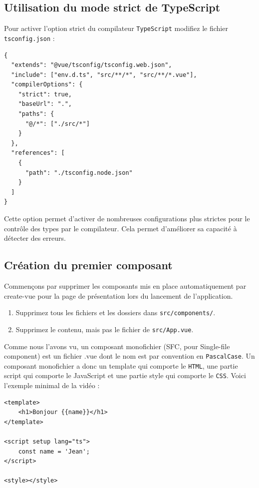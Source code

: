 \documentclass{article}
\begin{document}
\subsection{Utilisation du mode {\color{monOrange}strict} de {\color{monOrange}TypeScript}}
Pour activer l'option {\color{monOrange}strict} du compilateur {\tt TypeScript} modifiez le fichier {\tt tsconfig.json} :
\begin{verbatim}
{
  "extends": "@vue/tsconfig/tsconfig.web.json",
  "include": ["env.d.ts", "src/**/*", "src/**/*.vue"],
  "compilerOptions": {
    "strict": true,
    "baseUrl": ".",
    "paths": {
      "@/*": ["./src/*"]
    }
  },
  "references": [
    {
      "path": "./tsconfig.node.json"
    }
  ]
}
\end{verbatim} 

Cette option permet d'activer de nombreuses configurations plus strictes pour le contrôle des types par le compilateur. Cela permet d'améliorer sa capacité à détecter des erreurs.

\subsection{Création du premier composant}
Commençons par supprimer les composants mis en place automatiquement par {\color{monOrange}create-vue} pour la page de présentation lors du lancement de l'application. 
\begin{enumerate}
\item Supprimez tous les fichiers et les dossiers dans {\tt src/components/}.
\item Supprimez le contenu, mais pas le fichier de {\tt src/App.vue}.
\end{enumerate}

Comme nous l'avons vu, un composant {\color{blue} monofichier} (SFC, pour Single-file component) est un fichier {\color{blue} .vue} dont le nom est par convention en {\tt PascalCase}. Un composant monofichier a donc un template qui comporte le {\tt HTML}, une partie script qui comporte le JavaScript et une partie style qui comporte le {\tt CSS}. Voici l'exemple minimal de la vidéo :
\begin{verbatim}
<template>
    <h1>Bonjour {{name}}</h1>
</template>

<script setup lang="ts">
    const name = 'Jean';
</script>

<style></style>
\end{verbatim} 
\end{document}
